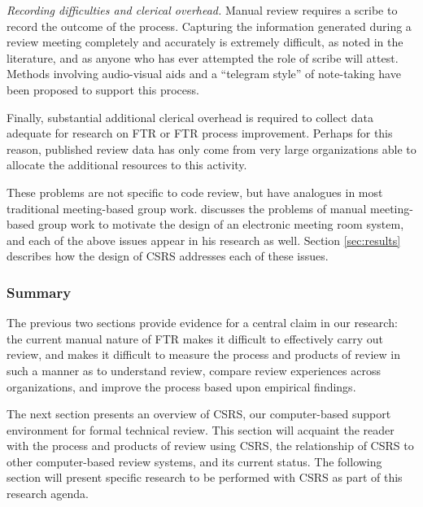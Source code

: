 \begin{itemizenoindent}
\item {\em Recording difficulties and clerical overhead.} Manual review
  requires a scribe to record the outcome of the process.  Capturing the
  information generated during a review meeting completely and accurately is
  extremely difficult, as noted in the literature, and as anyone who has ever
  attempted the role of scribe will attest. Methods involving audio-visual
  aids and a ``telegram style'' of note-taking have been proposed to support
  this process.
  
  Finally, substantial additional clerical overhead is required to
  collect data adequate for research on FTR or FTR process improvement.
  Perhaps for this reason, published review data has only come from very
  large organizations able to allocate the additional resources to this
  activity.

\end{itemizenoindent}

These problems are not specific to code review, but have analogues in most
traditional meeting-based group work.  \cite{Nunamaker91} discusses the
problems of manual meeting-based group work to motivate the design of an
electronic meeting room system, and each of the above issues appear in his
research as well. Section \ref{sec:results} describes how the design
of CSRS addresses each of these issues. 



\subsubsection*{Summary}

The previous two sections provide evidence for a central claim in our
research: the current manual nature of FTR makes it difficult to
effectively carry out review, and makes it difficult to measure the process
and products of review in such a manner as to understand review, compare
review experiences across organizations, and improve the process based upon
empirical findings.

The next section presents an overview of CSRS, our computer-based support
environment for formal technical review.  This section will acquaint the
reader with the process and products of review using CSRS, the relationship
of CSRS to other computer-based review systems, and its current status. The
following section will present specific research to be performed with CSRS
as part of this research agenda.





